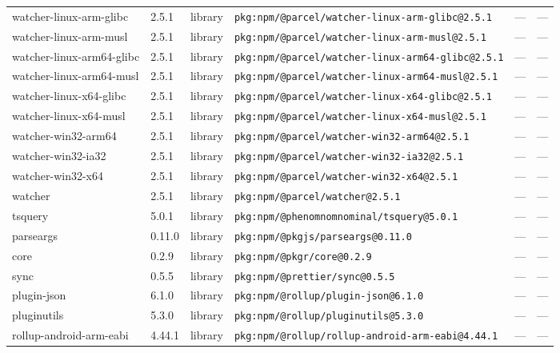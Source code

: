 \documentclass[11pt,a4paper]{article}
\begin{document}
\begin{longtable}{|p{4cm}|p{2cm}|p{1.6cm}|p{5cm}|p{1.5cm}|p{3.5cm}|}
\raggedright watcher-linux-arm-glibc & 2.5.1 & library & \small\texttt{pkg:npm/@parcel/watcher-linux-arm-glibc@2.5.1} & — & \small — \\
\raggedright watcher-linux-arm-musl & 2.5.1 & library & \small\texttt{pkg:npm/@parcel/watcher-linux-arm-musl@2.5.1} & — & \small — \\
\raggedright watcher-linux-arm64-glibc & 2.5.1 & library & \small\texttt{pkg:npm/@parcel/watcher-linux-arm64-glibc@2.5.1} & — & \small — \\
\raggedright watcher-linux-arm64-musl & 2.5.1 & library & \small\texttt{pkg:npm/@parcel/watcher-linux-arm64-musl@2.5.1} & — & \small — \\
\raggedright watcher-linux-x64-glibc & 2.5.1 & library & \small\texttt{pkg:npm/@parcel/watcher-linux-x64-glibc@2.5.1} & — & \small — \\
\raggedright watcher-linux-x64-musl & 2.5.1 & library & \small\texttt{pkg:npm/@parcel/watcher-linux-x64-musl@2.5.1} & — & \small — \\
\raggedright watcher-win32-arm64 & 2.5.1 & library & \small\texttt{pkg:npm/@parcel/watcher-win32-arm64@2.5.1} & — & \small — \\
\raggedright watcher-win32-ia32 & 2.5.1 & library & \small\texttt{pkg:npm/@parcel/watcher-win32-ia32@2.5.1} & — & \small — \\
\raggedright watcher-win32-x64 & 2.5.1 & library & \small\texttt{pkg:npm/@parcel/watcher-win32-x64@2.5.1} & — & \small — \\
\raggedright watcher & 2.5.1 & library & \small\texttt{pkg:npm/@parcel/watcher@2.5.1} & — & \small — \\
\raggedright tsquery & 5.0.1 & library & \small\texttt{pkg:npm/@phenomnomnominal/tsquery@5.0.1} & — & \small — \\
\raggedright parseargs & 0.11.0 & library & \small\texttt{pkg:npm/@pkgjs/parseargs@0.11.0} & — & \small — \\
\raggedright core & 0.2.9 & library & \small\texttt{pkg:npm/@pkgr/core@0.2.9} & — & \small — \\
\raggedright sync & 0.5.5 & library & \small\texttt{pkg:npm/@prettier/sync@0.5.5} & — & \small — \\
\raggedright plugin-json & 6.1.0 & library & \small\texttt{pkg:npm/@rollup/plugin-json@6.1.0} & — & \small — \\
\raggedright pluginutils & 5.3.0 & library & \small\texttt{pkg:npm/@rollup/pluginutils@5.3.0} & — & \small — \\
\raggedright rollup-android-arm-eabi & 4.44.1 & library & \small\texttt{pkg:npm/@rollup/rollup-android-arm-eabi@4.44.1} & — & \small — \\

\end{longtable}
\end{document}
